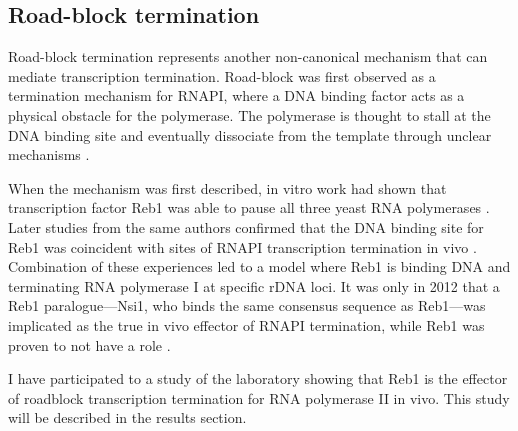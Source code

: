 \subsection{Road-block termination}
  
Road-block termination represents another non-canonical mechanism that can mediate transcription termination. 
Road-block was first observed as a termination mechanism for RNAPI, where  a DNA binding factor acts as a physical obstacle for the polymerase. 
The polymerase is thought to stall at the DNA binding site and eventually dissociate from the template through unclear mechanisms \cite{lang:1994:model, lang:1993:reb1}. 

When the mechanism was first described, in vitro work had shown that transcription factor Reb1 was able to pause all three yeast RNA polymerases \cite{lang:1994:model}. 
Later studies from the same authors confirmed that the DNA binding site for Reb1 was coincident with sites of RNAPI transcription termination in vivo \cite{reeder:1999:saccharomyces}. 
Combination of these experiences led to a model where Reb1 is binding DNA and terminating RNA polymerase I at specific rDNA loci. 
It was only in 2012 that a Reb1 paralogue---Nsi1, who binds the same consensus sequence as Reb1---was implicated as the true in vivo effector of RNAPI termination, while Reb1 was proven to not have a role \cite{reiter:2012:reb1homologue}. 

I have participated to a study of the laboratory showing that Reb1 is the effector of roadblock transcription termination for RNA polymerase II in vivo. 
This study will be described in the results section.

\clearpage